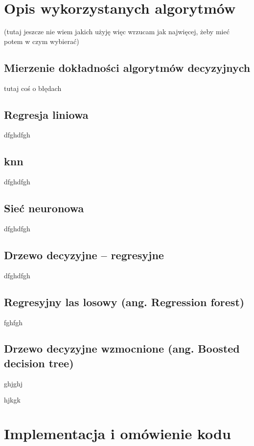 \documentclass[wmii, inf, mgr]{uwmthesis}
\begin{document}
\chapter{Opis wykorzystanych algorytmów }
(tutaj jeszcze nie wiem jakich użyję więc wrzucam jak najwięcej, żeby mieć potem w czym wybierać)
\section{Mierzenie dokładności algorytmów decyzyjnych}

tutaj coś o błędach

\section{Regresja liniowa}

dfghdfgh

\section{knn}

dfghdfgh


\section{Sieć neuronowa}

dfghdfgh


\section{Drzewo decyzyjne – regresyjne}

dfghdfgh

\section{Regresyjny las losowy (ang. Regression forest)}

fghfgh

\section{Drzewo decyzyjne wzmocnione (ang. Boosted decision tree)}

ghjghj


hjkgk




\chapter{Implementacja i omówienie kodu}
\end{document}
